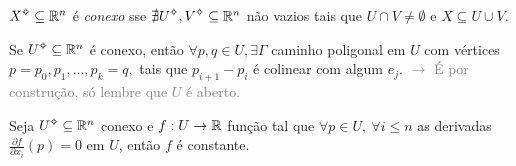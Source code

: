 \begin{definition}
\(X\ab\subseteq \R^n\) é \emph{conexo} sse \(\nexists  U\ab,V\ab\subseteq \R^n\) não vazios tais que \(U\cap V \neq \emptyset\) e \(X \subseteq U\cup V\). 
\end{definition}

\Ei

\begin{lemma}
  Se \(U\ab\subseteq \R^n\) é conexo, então \(\forall p,q\in U, \exists \Gamma\) caminho poligonal em \(U\) com vértices \(p = p_0, p_1, \ldots, p_k = q,\) tais que \(p_{i+1}- p_i\) é colinear com algum \(e_j\). 
  \textcolor{gray}{\(\rightarrow \) É por construção, só lembre que \(U\) é aberto.}
\end{lemma}

\begin{proposition}
  Seja \(U\ab\subseteq \R^n\) conexo e \(f:U\to \mathbb{R}\) função tal que \(\forall p \in U,\ \forall i\leq n\) as derivadas \(\frac{\partial f}{\partial x_i}(p) = 0\) em \(U\), então \(f\) é constante. 
\end{proposition}
